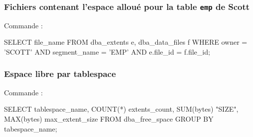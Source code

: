 \subsubsection{Fichiers contenant l'espace alloué pour la table \texttt{emp} de Scott}

Commande :
\begin{verbatimtab}
SELECT file_name 
FROM dba_extents e, dba_data_files f 
WHERE owner = 'SCOTT' AND segment_name = 'EMP' AND e.file_id = f.file_id;
\end{verbatimtab}

\subsubsection{Espace libre par tablespace}

Commande :
\begin{verbatimtab}
SELECT	tablespace_name,
	COUNT(*) extents_count,
	SUM(bytes) "SIZE",
	MAX(bytes) max_extent_size
FROM dba_free_space
GROUP BY tabespace_name;
\end{verbatimtab}